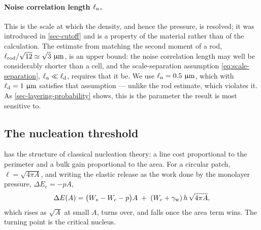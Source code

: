 \documentclass[a5paper]{article}
\begin{document}
\paragraph{Noise correlation length $\ell_{\rm n}$.} This is the scale at which the density, and hence the pressure, is resolved; it was introduced in \cref{sec-cutoff} and is a property of the material rather than of the calculation. The estimate from matching the second moment of a rod, $\ell_\mathrm{rod}/\sqrt{12}\simeq\sqrt3~\upmu\mathrm{m}$, is an upper bound: the noise correlation length may well be considerably shorter than a cell, and the scale-separation assumption \eqref{eq:scale-separation}, $\ell_{\rm n}\ll\ell_{\rm d}$, requires that it be. We use $\ell_{\rm n} = 0.5~\upmu\mathrm{m}$, which with $\ell_{\rm d} = 1~\upmu\mathrm{m}$ satisfies that assumption --- unlike the rod estimate, which violates it. As \cref{sec-layering-probability} shows, this is the parameter the result is most sensitive to.

\subsection{The nucleation threshold}
\label{sec-nucleation-threshold}

 has the structure of classical nucleation theory: a line cost proportional to the perimeter and a bulk gain proportional to the area. For a circular patch, $\ell = \sqrt{4\pi A}$, and writing the elastic release as the work done by the monolayer pressure, $\Delta E_e = -pA$,
\begin{align}
    \label{eq:dE-of-A}
    \Delta E(A) = \bigl(W_s - W_c - p\bigr)A \;+\; (W_c+\gamma_{\rm w})\,h\,\sqrt{4\pi A},
\end{align}
which rises as $\sqrt A$ at small $A$, turns over, and falls once the area term wins. The turning point is the critical nucleus.
\end{document}
